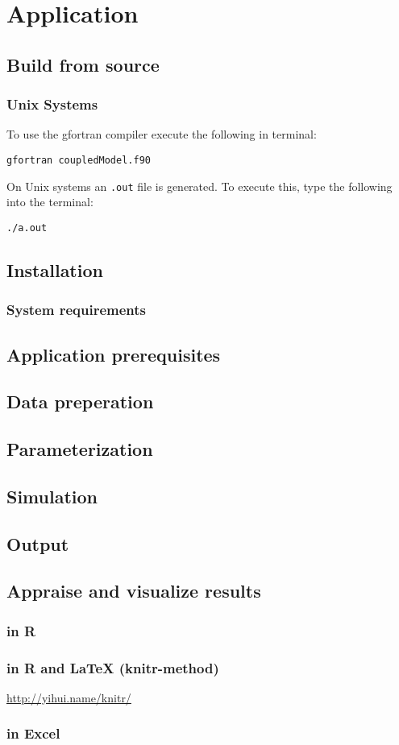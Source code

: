 \section{Application }

\subsection{Build from source}

\subsubsection{Unix Systems}


To use the gfortran compiler execute the following in terminal:

\texttt{gfortran coupledModel.f90}

On Unix systems an \texttt{.out} file is generated. To execute this, type the following into the terminal:

\texttt{./a.out}


\subsection{Installation}


\subsubsection{System requirements}


\subsection{Application prerequisites}


\subsection{Data preperation}


\subsection{Parameterization}


\subsection{Simulation}


\subsection{Output}


\subsection{Appraise and visualize results}


\subsubsection{in R }


\subsubsection{in R and \protect\LaTeX{} (knitr-method)}

\url{http://yihui.name/knitr/}

\subsubsection{in Excel}